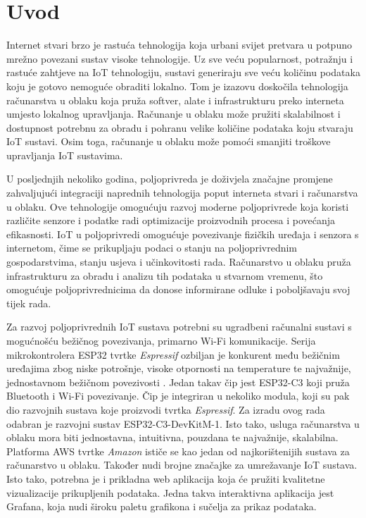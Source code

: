 \chapter{Uvod}

Internet stvari  brzo je rastuća tehnologija koja urbani svijet pretvara u potpuno mrežno povezani sustav visoke tehnologije. Uz sve veću popularnost, potražnju i rastuće zahtjeve na IoT tehnologiju, sustavi generiraju sve veću količinu podataka koju je gotovo nemoguće obraditi lokalno. Tom je izazovu doskočila tehnologija računarstva u oblaku  koja pruža softver, alate i infrastrukturu preko interneta umjesto lokalnog upravljanja. Računanje u oblaku može pružiti skalabilnost i dostupnost potrebnu za obradu i pohranu velike količine podataka koju stvaraju IoT sustavi. Osim toga, računanje u oblaku može pomoći smanjiti troškove upravljanja IoT sustavima. 

U posljednjih nekoliko godina, poljoprivreda je doživjela značajne promjene zahvaljujući integraciji naprednih tehnologija poput interneta stvari i računarstva u oblaku. Ove tehnologije omogućuju razvoj moderne poljoprivrede koja koristi različite senzore i podatke radi optimizacije proizvodnih procesa i povećanja efikasnosti. IoT u poljoprivredi omogućuje povezivanje fizičkih uređaja i senzora s internetom, čime se prikupljaju podaci o stanju na poljoprivrednim gospodarstvima, stanju usjeva i učinkovitosti rada. Računarstvo u oblaku pruža infrastrukturu za obradu i analizu tih podataka u stvarnom vremenu, što omogućuje poljoprivrednicima da donose informirane odluke i poboljšavaju svoj tijek rada. 

Za razvoj poljoprivrednih IoT sustava potrebni su ugradbeni računalni sustavi s mogućnošću bežičnog povezivanja, primarno Wi-Fi komunikacije. Serija mikrokontrolera ESP32 tvrtke \textit{Espressif} ozbiljan je konkurent među bežičnim uređajima zbog niske potrošnje, visoke otpornosti na temperature te najvažnije, jednostavnom bežičnom povezivosti \cite{top_iot_boards}. Jedan takav čip jest ESP32-C3 koji pruža Bluetooth i Wi-Fi povezivanje. Čip je integriran u nekoliko modula, koji su pak dio razvojnih sustava koje proizvodi tvrtka \textit{Espressif}. Za izradu ovog rada odabran je razvojni sustav ESP32-C3-DevKitM-1. Isto tako, usluga računarstva u oblaku mora biti jednostavna, intuitivna, pouzdana te najvažnije, skalabilna. Platforma AWS tvrtke \textit{Amazon} ističe se kao jedan od najkorištenijih sustava za računarstvo u oblaku. Također nudi brojne značajke za umrežavanje IoT sustava. Isto tako, potrebna je i prikladna web aplikacija koja će pružiti kvalitetne vizualizacije prikupljenih podataka. Jedna takva interaktivna aplikacija jest Grafana, koja nudi široku paletu grafikona i sučelja za prikaz podataka. 

